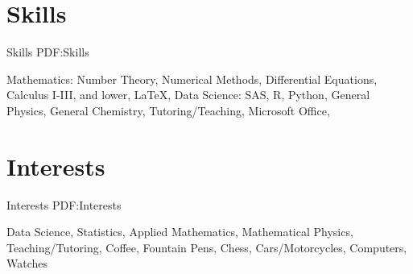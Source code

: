 \documentclass[letterpaper,10pt,oneside]{article}
\begin{document}
\begin{body}
\begin{comment}
\section
{Professional Affiliations\newline}
{Professional Affiliations}
{PDF:ProfessionalAffiliations}

{\textbf{Phi Theta Kappa Honor Society}},
Virginia, USA

\GapNoBreak
\BulletItem
Member
\hfill
\DatestampY{2015} --
Present

\end{comment}

\section
{Skills}
{Skills}
{PDF:Skills}

{Mathematics: Number Theory, Numerical Methods, Differential Equations, Calculus I-III, and lower}, {\LaTeX}, {Data Science: SAS, R, Python}, {General Physics}, {General Chemistry}, {Tutoring/Teaching}, {Microsoft Office},     

\section
{Interests}
{Interests}
{PDF:Interests}

Data Science,
Statistics,
Applied Mathematics,
Mathematical Physics,
Teaching/Tutoring,
Coffee, 
Fountain Pens, 
Chess, 
Cars/Motorcycles, 
Computers, 
Watches


\end{body}

\label{LastPage}~
\end{document}

